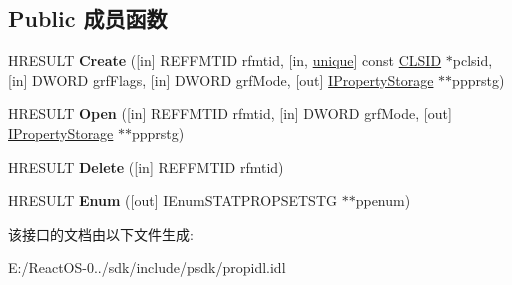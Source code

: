 \subsection*{Public 成员函数}
\begin{DoxyCompactItemize}
\item 
\mbox{\label{interface_i_property_set_storage_a05b00eb9f545702161588e14d4a8994f}} 
H\+R\+E\+S\+U\+LT {\bfseries Create} (\mbox{[}in\mbox{]} R\+E\+F\+F\+M\+T\+ID rfmtid, \mbox{[}in, \hyperlink{interfaceunique}{unique}\mbox{]} const \hyperlink{struct___i_i_d}{C\+L\+S\+ID} $\ast$pclsid, \mbox{[}in\mbox{]} D\+W\+O\+RD grf\+Flags, \mbox{[}in\mbox{]} D\+W\+O\+RD grf\+Mode, \mbox{[}out\mbox{]} \hyperlink{interface_i_property_storage}{I\+Property\+Storage} $\ast$$\ast$ppprstg)
\item 
\mbox{\label{interface_i_property_set_storage_a0b100610bf5b0ac58b4327e31faa2008}} 
H\+R\+E\+S\+U\+LT {\bfseries Open} (\mbox{[}in\mbox{]} R\+E\+F\+F\+M\+T\+ID rfmtid, \mbox{[}in\mbox{]} D\+W\+O\+RD grf\+Mode, \mbox{[}out\mbox{]} \hyperlink{interface_i_property_storage}{I\+Property\+Storage} $\ast$$\ast$ppprstg)
\item 
\mbox{\label{interface_i_property_set_storage_a5ac7c3a093aa6a492d2a5a040f0d4fd4}} 
H\+R\+E\+S\+U\+LT {\bfseries Delete} (\mbox{[}in\mbox{]} R\+E\+F\+F\+M\+T\+ID rfmtid)
\item 
\mbox{\label{interface_i_property_set_storage_a7ef31af4c6506b06851e563b98ff0a3f}} 
H\+R\+E\+S\+U\+LT {\bfseries Enum} (\mbox{[}out\mbox{]} I\+Enum\+S\+T\+A\+T\+P\+R\+O\+P\+S\+E\+T\+S\+TG $\ast$$\ast$ppenum)
\end{DoxyCompactItemize}


该接口的文档由以下文件生成\+:\begin{DoxyCompactItemize}
\item 
E\+:/\+React\+O\+S-\/0../sdk/include/psdk/propidl.\+idl\end{DoxyCompactItemize}
